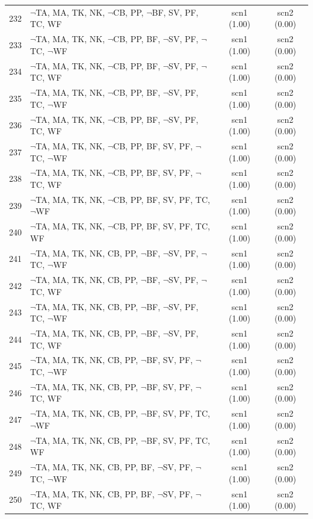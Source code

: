\documentclass[12pt]{article}
\begin{document}
\begin{longtable}{|l|l|c|c|}
232 & $\neg$TA, MA, TK, NK, $\neg$CB, PP, $\neg$BF, SV, PF, TC, WF & scn1 (1.00) & scn2 (0.00)\\
233 & $\neg$TA, MA, TK, NK, $\neg$CB, PP, BF, $\neg$SV, PF, $\neg$TC, $\neg$WF & scn1 (1.00) & scn2 (0.00)\\
234 & $\neg$TA, MA, TK, NK, $\neg$CB, PP, BF, $\neg$SV, PF, $\neg$TC, WF & scn1 (1.00) & scn2 (0.00)\\
235 & $\neg$TA, MA, TK, NK, $\neg$CB, PP, BF, $\neg$SV, PF, TC, $\neg$WF & scn1 (1.00) & scn2 (0.00)\\
236 & $\neg$TA, MA, TK, NK, $\neg$CB, PP, BF, $\neg$SV, PF, TC, WF & scn1 (1.00) & scn2 (0.00)\\
237 & $\neg$TA, MA, TK, NK, $\neg$CB, PP, BF, SV, PF, $\neg$TC, $\neg$WF & scn1 (1.00) & scn2 (0.00)\\
238 & $\neg$TA, MA, TK, NK, $\neg$CB, PP, BF, SV, PF, $\neg$TC, WF & scn1 (1.00) & scn2 (0.00)\\
239 & $\neg$TA, MA, TK, NK, $\neg$CB, PP, BF, SV, PF, TC, $\neg$WF & scn1 (1.00) & scn2 (0.00)\\
240 & $\neg$TA, MA, TK, NK, $\neg$CB, PP, BF, SV, PF, TC, WF & scn1 (1.00) & scn2 (0.00)\\
241 & $\neg$TA, MA, TK, NK, CB, PP, $\neg$BF, $\neg$SV, PF, $\neg$TC, $\neg$WF & scn1 (1.00) & scn2 (0.00)\\
242 & $\neg$TA, MA, TK, NK, CB, PP, $\neg$BF, $\neg$SV, PF, $\neg$TC, WF & scn1 (1.00) & scn2 (0.00)\\
243 & $\neg$TA, MA, TK, NK, CB, PP, $\neg$BF, $\neg$SV, PF, TC, $\neg$WF & scn1 (1.00) & scn2 (0.00)\\
244 & $\neg$TA, MA, TK, NK, CB, PP, $\neg$BF, $\neg$SV, PF, TC, WF & scn1 (1.00) & scn2 (0.00)\\
245 & $\neg$TA, MA, TK, NK, CB, PP, $\neg$BF, SV, PF, $\neg$TC, $\neg$WF & scn1 (1.00) & scn2 (0.00)\\
246 & $\neg$TA, MA, TK, NK, CB, PP, $\neg$BF, SV, PF, $\neg$TC, WF & scn1 (1.00) & scn2 (0.00)\\
247 & $\neg$TA, MA, TK, NK, CB, PP, $\neg$BF, SV, PF, TC, $\neg$WF & scn1 (1.00) & scn2 (0.00)\\
248 & $\neg$TA, MA, TK, NK, CB, PP, $\neg$BF, SV, PF, TC, WF & scn1 (1.00) & scn2 (0.00)\\
249 & $\neg$TA, MA, TK, NK, CB, PP, BF, $\neg$SV, PF, $\neg$TC, $\neg$WF & scn1 (1.00) & scn2 (0.00)\\
250 & $\neg$TA, MA, TK, NK, CB, PP, BF, $\neg$SV, PF, $\neg$TC, WF & scn1 (1.00) & scn2 (0.00)\\

\end{longtable}
\end{document}
